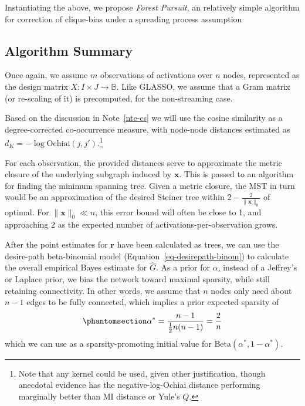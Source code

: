 \documentclass[%
	12pt,
		oneside,
		letterpaper
]{book}
\begin{document}
Instantiating the above, we propose \emph{Forest Pursuit}, an relatively
simple algorithm for correction of clique-bias under a spreading process
assumption

\subsection{Algorithm Summary}\label{algorithm-summary}

Once again, we assume \(m\) observations of activations over \(n\)
nodes, represented as the design matrix
\(X:I\times J \rightarrow \mathbb{B}\). Like GLASSO, we assume that a
Gram matrix (or re-scaling of it) is precomputed, for the non-streaming
case.

Based on the discussion in Note~\ref{nte-cs} we will use the cosine
similarity as a degree-corrected co-occurrence measure, with node-node
distances estimated as \(d_K=-\log{\text{Ochiai}(j,j')}\).\footnote{
  Note that any kernel could be used, given other justification, though
  anecdotal evidence has the negative-log-Ochiai distance performing
  marginally better than MI distance or Yule's \(Q\).}

For each observation, the provided distances serve to approximate the
metric closure of the underlying subgraph induced by \(\mathbf{x}\).
This is passed to an algorithm for finding the minimum spanning tree.
Given a metric closure, the MST in turn would be an approximation of the
desired Steiner tree within \(2-\tfrac{2}{\|\mathbf{x}\|_0}\) of
optimal.\autocite{fastalgorithmSteiner_Kou1981} For
\(\|\mathbf{x}\|_0 \ll n\), this error bound will often be close to 1,
and approaching 2 as the expected number of activations-per-observation
grows.

After the point estimates for \(\mathbf{r}\) have been calculated as
trees, we can use the desire-path beta-binomial model
(Equation~\ref{eq-desirepath-binom}) to calculate the overall empirical
Bayes estimate for \(\hat{G}\). As a prior for \(\alpha\), instead of a
Jeffrey's or Laplace prior, we bias the network toward maximal sparsity,
while still retaining connectivity. In other words, we assume that \(n\)
nodes only need about \(n-1\) edges to be fully connected, which implies
a prior expected sparsity of
\begin{equation}\phantomsection\label{eq-min-connect}{
\alpha^*=\frac{n-1}{\tfrac{1}{2}n(n-1)} = \frac{2}{n}
}\end{equation} which we can use as a sparsity-promoting initial value
for \(\text{Beta}(\alpha^*,1-\alpha^*)\).
\end{document}
